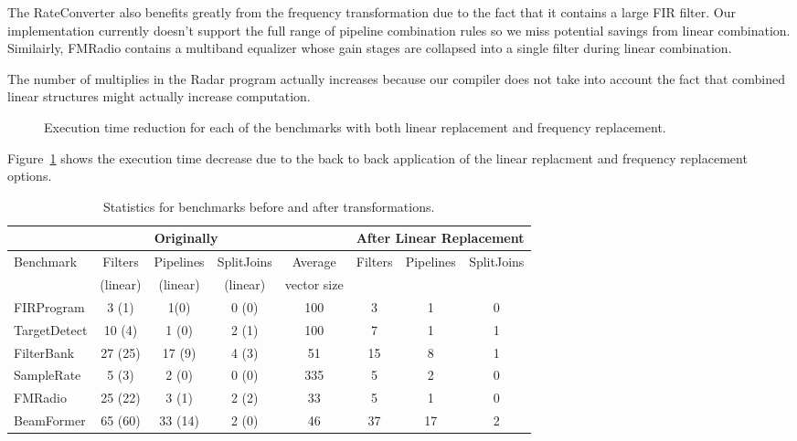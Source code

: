 The RateConverter also benefits greatly from the frequency
transformation due to the fact that it contains a large FIR
filter. Our implementation currently doesn't support the full range of
pipeline combination rules so we miss potential savings from linear
combination. Similairly, FMRadio contains a multiband equalizer whose gain stages are collapsed
into a single filter during linear combination.

The number of multiplies in the Radar program actually increases because our 
compiler does not take into account the fact that combined linear structures 
might actually increase computation. %

\begin{figure}
\center
\epsfxsize=3.2in
\vspace{-6pt}
\caption{Execution time reduction for each of the benchmarks with both linear replacement and frequency replacement.}
\label{fig:execution-speedup}
\vspace{-12pt}
\end{figure}

Figure~\ref{fig:execution-speedup} shows the execution time decrease due to the back to back
application of the linear replacment and frequency replacement options.


\begin{table*}[t]
\centering
\small
\begin{tabular}{|l|c|c|c||c||c|c|c|} 
\hline
          & \multicolumn{3}{|c||}{Originally}  &             & \multicolumn{3}{|c|}{After Linear Replacement} \\
\hline
Benchmark & Filters & Pipelines & SplitJoins & Average     & Filters      & Pipelines         & SplitJoins \\
          & (linear)& (linear)  & (linear)   & vector size &              &                   &            \\
\hline
FIRProgram & 3 (1) & 1(0) & 0 (0) & 100 & 3 & 1 & 0 \\
\hline
TargetDetect & 10 (4) & 1 (0) & 2 (1) & 100 & 7 & 1 & 1 \\
\hline
FilterBank & 27 (25) & 17 (9) & 4 (3) & 51 & 15 & 8 & 1 \\
\hline
SampleRate & 5 (3) & 2 (0) & 0 (0) & 335 & 5 & 2 & 0 \\
\hline
FMRadio & 25 (22) & 3 (1) & 2 (2) & 33 & 5 & 1 & 0 \\
\hline
BeamFormer & 65 (60) & 33 (14) & 2 (0) & 46 & 37 & 17 & 2\\
\hline
\end{tabular}
\caption{Statistics for benchmarks before and after transformations.}
\label{fig:benchmark-stastics}
\end{table*}
